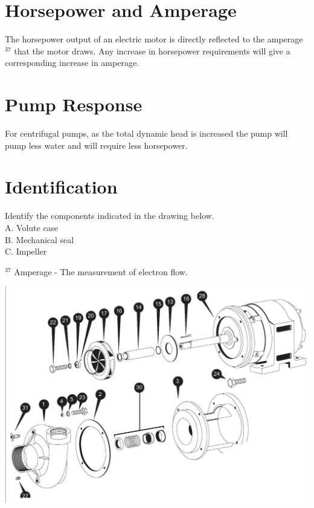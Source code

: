 \documentclass[10pt]{article}
\begin{document}
\section{Horsepower and Amperage}
The horsepower output of an electric motor is directly reflected to the amperage ${ }^{37}$ that the motor draws. Any increase in horsepower requirements will give a corresponding increase in amperage.

\section{Pump Response}
For centrifugal pumps, as the total dynamic head is increased the pump will pump less water and will require less horsepower.

\section{Identification}
Identify the components indicated in the drawing below.\\
A. Volute case\\
B. Mechanical seal\\
C. Impeller

${ }^{37}$ Amperage - The measurement of electron flow.

\includegraphics[max width=\textwidth]{2022_11_03_65aa625ded296bdfd01fg-21}
\end{document}
